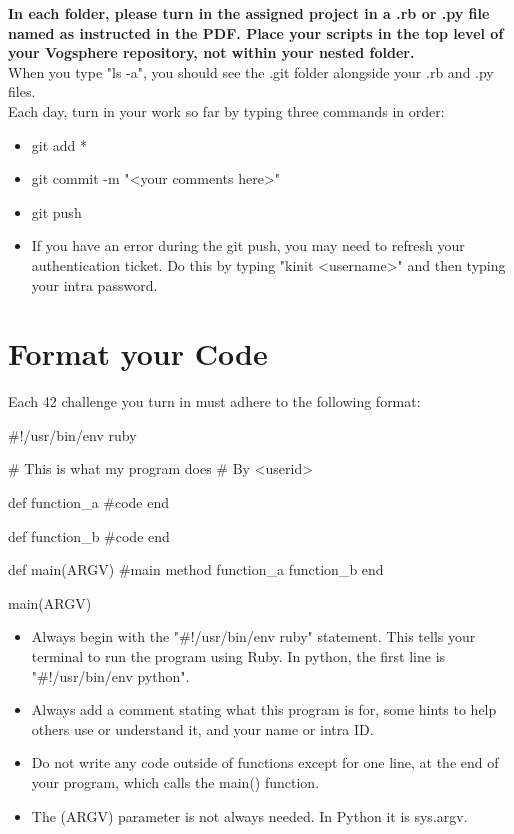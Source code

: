 \documentclass{42-en}
\begin{document}
\textbf{In each folder, please turn in the assigned project in a .rb or .py file named as instructed in the PDF. Place your scripts in the top level of your Vogsphere repository, not within your nested folder.}\\

When you type "ls -a", you should see the .git folder alongside your .rb and .py files.\\

Each day, turn in your work so far by typing three commands in order: 
	\begin{itemize}
		\item git add *
		\item git commit -m "<your comments here>"
		\item git push
		\item If you have an error during the git push, you may need to refresh your authentication ticket. Do this by typing "kinit <username>" and then typing your intra password.
	\end{itemize}


\chapter{Format your Code}

Each 42 challenge you turn in must adhere to the following format:

\begin{42rbcode}
#!/usr/bin/env ruby

# This is what my program does
# By <userid>

def function_a
 #code
end

def function_b
 #code
end

def main(ARGV)
 #main method
 function_a
 function_b
end

main(ARGV)
\end{42rbcode}

\begin{itemize}
	\item Always begin with the "\#!/usr/bin/env ruby" statement. This tells your terminal to run the program using Ruby. In python, the first line is "\#!/usr/bin/env python".
	\item Always add a comment stating what this program is for, some hints to help others use or understand it, and your name or intra ID.
	\item Do not write any code outside of functions except for one line, at the end of your program, which calls the main() function.
	\item The (ARGV) parameter is not always needed. In Python it is sys.argv.
\end{itemize}

\end{document}
